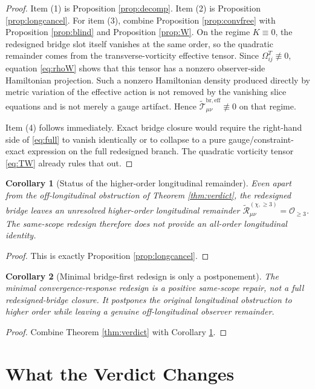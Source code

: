 \documentclass[11pt]{article}
\newcommand{\ReEff}{\widetilde{\mathcal T}_{\mu\nu}^{\mathrm{br,eff}}}
\newcommand{\ReLong}{\widetilde{\mathcal R}_{\mu\nu}^{(\chi,\ge 3)}}
\newtheorem{corollary}{Corollary}
\begin{document}
\begin{proof}
Item (1) is Proposition \ref{prop:decomp}. Item (2) is Proposition \ref{prop:longcancel}. For item (3), combine Proposition \ref{prop:convfree} with Proposition \ref{prop:blind} and Proposition \ref{prop:W}. On the regime \(K\equiv0\), the redesigned bridge slot itself vanishes at the same order, so the quadratic remainder comes from the transverse-vorticity effective tensor. Since \(\Omega_{ij}^T\not\equiv0\), equation \eqref{eq:rhoW} shows that this tensor has a nonzero observer-side Hamiltonian projection. Such a nonzero Hamiltonian density produced directly by metric variation of the effective action is not removed by the vanishing slice equations and is not merely a gauge artifact. Hence \(\ReEff\not\equiv0\) on that regime.

Item (4) follows immediately. Exact bridge closure would require the right-hand side of \eqref{eq:full} to vanish identically or to collapse to a pure gauge/constraint-exact expression on the full redesigned branch. The quadratic vorticity tensor \eqref{eq:TW} already rules that out.
\end{proof}

\begin{corollary}[Status of the higher-order longitudinal remainder]
\label{cor:high}
Even apart from the off-longitudinal obstruction of Theorem \ref{thm:verdict}, the redesigned bridge leaves an unresolved higher-order longitudinal remainder \(\ReLong=\mathcal O_{\ge 3}\). The same-scope redesign therefore does not provide an all-order longitudinal identity.
\end{corollary}

\begin{proof}
This is exactly Proposition \ref{prop:longcancel}.
\end{proof}

\begin{corollary}[Minimal bridge-first redesign is only a postponement]
\label{cor:postpone}
The minimal convergence-response redesign is a positive same-scope repair, not a full redesigned-bridge closure. It postpones the original longitudinal obstruction to higher order while leaving a genuine off-longitudinal observer remainder.
\end{corollary}

\begin{proof}
Combine Theorem \ref{thm:verdict} with Corollary \ref{cor:high}.
\end{proof}

\section{What the Verdict Changes}
\end{document}
